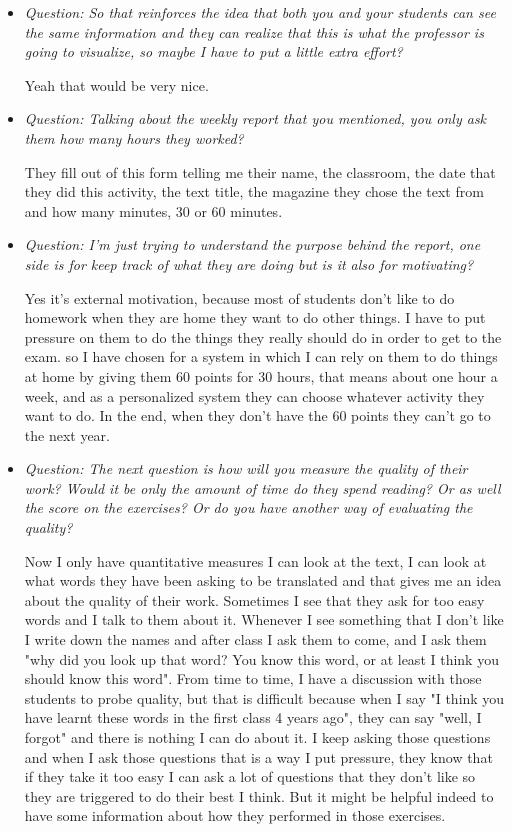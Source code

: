 \begin{itemize}
	\item \textit{Question: So that reinforces the idea that both you and your students can see the same information and they can realize that this is what the professor is going to visualize, so maybe I have to put a little extra effort?}
	
Yeah that would be very nice.

	\item \textit{Question: Talking about the weekly report that you mentioned, you only ask them how many hours they worked? }

They fill out of this form telling me their name, the classroom, the date that they did this activity, the text title, the magazine they chose the text from and how many minutes, 30 or 60 minutes.

	\item \textit{Question: I'm just trying to understand the purpose behind the report, one side is for keep track of what they are doing but is it also for motivating?}
	
Yes it's external motivation, because most of students don't like to do homework when they are home they want to do other things. I have to put pressure on them to do the things they really should do in order to get to the exam. so I have chosen for a system in which I can rely on them to do things at home by giving them 60 points for 30 hours, that means about one hour a week, and as a personalized system they can choose whatever activity they want to do. In the end, when they don't have the 60 points they can't go to the next year.

	\item \textit{Question: The next question is how will you measure the quality of their work? Would it be only the amount of time do they spend reading? Or as well the score on the exercises? Or do you have another way of evaluating the quality?}
	
Now I only have quantitative measures I can look at the text, I can look at what words they have been asking to be translated and that gives me an idea about the quality of their work. Sometimes I see that they ask for too easy words and I talk to them about it. Whenever I see something that I don't like I write down the names and after class I ask them to come, and I ask them "why did you look up that word? You know this word, or at least I think you should know this word". From time to time, I have a discussion with those students to probe quality, but that is difficult because when I say "I think you have learnt these words in the first class 4 years ago", they can say "well, I forgot" and there is nothing I can do about it. I keep asking those questions and when I ask those questions that is a way I put pressure, they know that if they take it too easy I can ask a lot of questions that they don't like so they are triggered to do their best I think.
But it might be helpful indeed to have some information about how they performed in those exercises.


\end{itemize}
